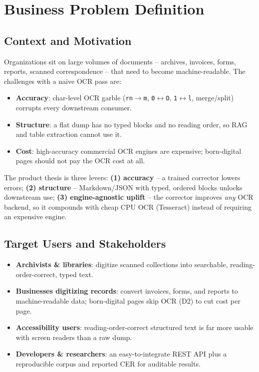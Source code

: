\documentclass[12pt,a4paper]{article}
\begin{document}
\section{Business Problem Definition}

\subsection{Context and Motivation}

Organizations sit on large volumes of documents -- archives, invoices, forms, reports, scanned correspondence -- that need to become machine-readable. The challenges with a naive OCR pass are:
\begin{itemize}
  \item \textbf{Accuracy}: char-level OCR garble (\texttt{rn$\rightarrow$m}, \texttt{0$\leftrightarrow$O}, \texttt{1$\leftrightarrow$l}, merge/split) corrupts every downstream consumer.
  \item \textbf{Structure}: a flat dump has no typed blocks and no reading order, so RAG and table extraction cannot use it.
  \item \textbf{Cost}: high-accuracy commercial OCR engines are expensive; born-digital pages should not pay the OCR cost at all.
\end{itemize}

The product thesis is three levers: \textbf{(1) accuracy} -- a trained corrector lowers errors; \textbf{(2) structure} -- Markdown/JSON with typed, ordered blocks unlocks downstream use; \textbf{(3) engine-agnostic uplift} -- the corrector improves \emph{any} OCR backend, so it compounds with cheap CPU OCR (Tesseract) instead of requiring an expensive engine.

\subsection{Target Users and Stakeholders}

\begin{itemize}
  \item \textbf{Archivists \& libraries}: digitize scanned collections into searchable, reading-order-correct, typed text.
  \item \textbf{Businesses digitizing records}: convert invoices, forms, and reports to machine-readable data; born-digital pages skip OCR (D2) to cut cost per page.
  \item \textbf{Accessibility users}: reading-order-correct structured text is far more usable with screen readers than a raw dump.
  \item \textbf{Developers \& researchers}: an easy-to-integrate REST API plus a reproducible corpus and reported CER for auditable results.
\end{itemize}
\end{document}
